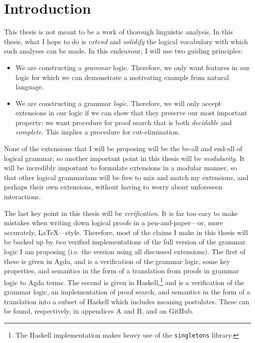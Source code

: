 \section{Introduction}
\label{sec:introduction}

This thesis is not meant to be a work of thorough linguistic
analysis. In this thesis, what I hope to do is \emph{extend} and
\emph{solidify} the logical vocabulary with which such analyses can be
made. In this endeavour, I will use two guiding principles:
\begin{itemize}
\item We are constructing a \emph{grammar} logic. Therefore, we only
  want features in our logic for which we can demonstrate a motivating
  example from natural language.
\item We are constructing a grammar \emph{logic}. Therefore, we will
  only accept extensions in our logic if we can show that they
  preserve our most important property: we want procedure for proof
  search that is both \emph{decidable} and \emph{complete}. This
  implies a procedure for cut-elimination.
\end{itemize}
None of the extensions that I will be proposing will be the be-all
and end-all of logical grammar, so another important point in this
thesis will be \emph{modularity}. It will be incredibly important to
formulate extensions in a modular manner, so that other logical
grammarians will be free to mix and match my extensions, and perhaps
their own extensions, without having to worry about unforeseen
interactions.

The last key point in this thesis will be \emph{verification}. It is
far too easy to make mistakes when writing down logical proofs in a
pen-and-paper---or, more accurately, \LaTeX---style. Therefore, most
of the claims I make in this thesis will be backed up by \emph{two}
verified implementations of the full version of the grammar logic I am
proposing (i.e. the version using all discussed extensions). The first
of these is given in Agda, and is a verification of the grammar logic,
some key properties, and semantics in the form of a translation from
proofs in grammar logic to Agda terms. The second is given in
Haskell,\footnote{%
  The Haskell implementation makes heavy use of the
  \texttt{singletons} library.
}
and is a verification of the grammar logic, an implementation of proof
search, and semantics in the form of a translation into a subset of
Haskell which includes meaning postulates. These can be found,
respectively, in appendices A and B, and on GitHub.

